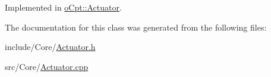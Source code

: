 Implemented in \hyperlink{classo_cpt_1_1_actuator_aa41132ff134e8b067353459dedbb0f37}{o\+Cpt\+::\+Actuator}.



The documentation for this class was generated from the following files\+:\begin{DoxyCompactItemize}
\item 
include/\+Core/\hyperlink{_actuator_8h}{Actuator.\+h}\item 
src/\+Core/\hyperlink{_actuator_8cpp}{Actuator.\+cpp}\end{DoxyCompactItemize}
